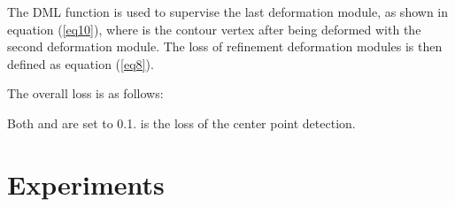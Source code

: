 \documentclass[10pt,twocolumn,letterpaper]{article}
\begin{document}
The DML function is used to supervise the last deformation module, as shown in equation (\ref{eq10}), where  is the contour vertex after being deformed with the second deformation module. The loss of refinement deformation modules is then defined as equation (\ref{eq8}).
\begin{small}
\vspace{-3mm}

\end{small}The overall loss is as follows:\vspace{-3mm}
\begin{small}

\end{small}\vspace{-1mm}Both  and  are set to 0.1.  is the loss of the center point detection.

\section{Experiments}
\label{sec:experiments}
\end{document}
